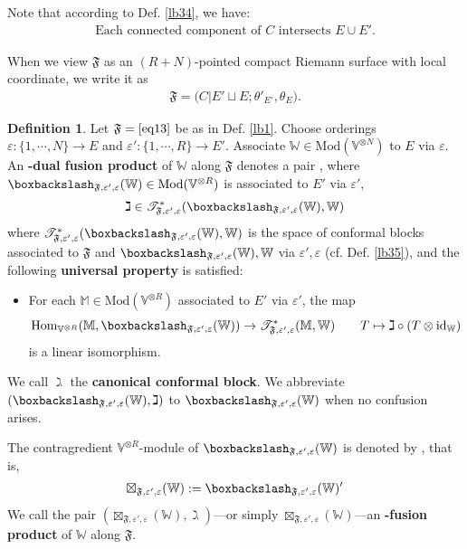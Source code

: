 \documentclass[11pt,b5paper,notitlepage]{article}
\theoremstyle{definition}
\newtheorem{df}{Definition}[section]
\theoremstyle{plain}
\newcommand{\fk}{\mathfrak}
\newcommand{\Hom}{\mathrm{Hom}}
\newcommand{\scr}{\mathscr}
\newcommand{\Vbb}{\mathbb V}
\newcommand{\Wbb}{\mathbb W}
\newcommand{\Mbb}{\mathbb M}
\newcommand{\<}{\left\langle}
\renewcommand{\>}{\right\rangle}
\newcommand{\ST}{\mathscr{T}}
\newcommand{\bbs}{\boxbackslash}
\newcommand{\Mod}{\mathrm{Mod}}
\newcommand{\id}{\mathrm{id}}
\newcommand{\eps}{\varepsilon}
\newcommand{\ff}{\mathfrak{F}}
\newcommand{\hqed}{\hfill\qedsymbol}
\numberwithin{equation}{section}
\begin{document}
Note that according to Def. \ref{lb34}, we have:
\begin{align}\label{eq8}
\text{Each connected component of $C$ intersects $E\cup E'$}.
\end{align}

When we view $\ff$ as an $(R+N)$-pointed compact Riemann surface with local coordinate, we write it as
\begin{align}\label{eq14}
	\fk F=\big(C\big|E'\sqcup E;\theta'_{E'},\theta_E).
	\end{align}




\begin{df}\label{lb2}
	Let $\ff=\eqref{eq13}$ be as in Def. \ref{lb1}. Choose orderings $\eps:\{1,\cdots,N\}\rightarrow E$ and $\eps':\{1,\cdots ,R\}\rightarrow E'$. Associate $\Wbb\in\Mod(\Vbb^{\otimes N})$ to $E$ via $\eps$. An \textbf{\pmb{$(\eps',\eps)$}-dual fusion product} of $\Wbb$ along $\fk F$ denotes a pair \pmb{$(\bbs_{\fk F,\eps',\eps} (\Wbb),\gimel)$}, where $\bbs_{\fk F,\eps',\eps} (\Wbb)\in\Mod(\Vbb^{\otimes R})$ is associated to $E'$ via $\eps'$,
\begin{align*}
\gimel\in\ST_{\fk F,\eps',\eps}^*(\bbs_{\fk F,\eps',\eps} (\Wbb),\Wbb)
\end{align*}
where $\ST_{\fk F,\eps',\eps}^*(\bbs_{\fk F,\eps',\eps} (\Wbb),\Wbb)$ is the space of conformal blocks associated to $\ff$ and $\bbs_{\fk F,\eps',\eps} (\Wbb),\Wbb$ via $\eps',\eps$ (cf. Def. \ref{lb35}), and the following \textbf{universal property} is satisfied:
\begin{itemize}
\item For each $\Mbb\in\Mod(\Vbb^{\otimes R})$ associated to $E'$ via $\eps'$, the map
\begin{align}\label{eq15}
\Hom_{\Vbb^{\otimes R}}(\Mbb,\bbs_{\fk F,\eps',\eps} (\Wbb))\rightarrow \scr T_{\fk F,\eps',\eps}^*(\Mbb,\Wbb)\qquad T\mapsto \gimel\circ(T\otimes\id_\Wbb)
\end{align}
is a linear isomorphism. 
\end{itemize}
We call $\gimel$ the \textbf{canonical conformal block}. We abbreviate $(\bbs_{\fk F,\eps',\eps} (\Wbb),\gimel)$ to $\bbs_{\fk F,\eps',\eps}(\Wbb)$ when no confusion arises. 

The contragredient $\Vbb^{\otimes R}$-module of $\bbs_{\fk F,\eps',\eps} (\Wbb)$ is denoted by \pmb{$\boxtimes_{\fk F,\eps',\eps}(\Wbb)$}, that is,
\begin{align*}
\boxtimes_{\fk F,\eps',\eps}(\Wbb):=\bbs_{\fk F,\eps',\eps}(\Wbb)'
\end{align*}
We call the pair $(\boxtimes_{\fk F,\eps',\eps} (\Wbb),\gimel)$---or simply $\boxtimes_{\fk F,\eps',\eps} (\Wbb)$---an \textbf{\pmb{$(\eps',\eps)$}-fusion product} of $\Wbb$ along $\ff$.  \hqed
\end{df}
\end{document}
